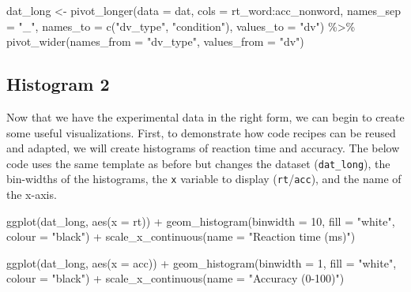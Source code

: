 \documentclass[
  english,
  doc,floatsintext]{apa6}
\newenvironment{Shaded}{\begin{snugshade}}{\end{snugshade}}
\newcommand{\AttributeTok}[1]{\textcolor[rgb]{0.77,0.63,0.00}{#1}}
\newcommand{\DecValTok}[1]{\textcolor[rgb]{0.00,0.00,0.81}{#1}}
\newcommand{\FunctionTok}[1]{\textcolor[rgb]{0.00,0.00,0.00}{#1}}
\newcommand{\NormalTok}[1]{#1}
\newcommand{\OtherTok}[1]{\textcolor[rgb]{0.56,0.35,0.01}{#1}}
\newcommand{\SpecialCharTok}[1]{\textcolor[rgb]{0.00,0.00,0.00}{#1}}
\newcommand{\StringTok}[1]{\textcolor[rgb]{0.31,0.60,0.02}{#1}}
\begin{document}
\begin{Shaded}
\begin{Highlighting}[]
\NormalTok{dat\_long }\OtherTok{\textless{}{-}} \FunctionTok{pivot\_longer}\NormalTok{(}\AttributeTok{data =}\NormalTok{ dat, }
                         \AttributeTok{cols =}\NormalTok{ rt\_word}\SpecialCharTok{:}\NormalTok{acc\_nonword, }
                         \AttributeTok{names\_sep =} \StringTok{"\_"}\NormalTok{, }
                         \AttributeTok{names\_to =} \FunctionTok{c}\NormalTok{(}\StringTok{"dv\_type"}\NormalTok{, }\StringTok{"condition"}\NormalTok{),}
                         \AttributeTok{values\_to =} \StringTok{"dv"}\NormalTok{) }\SpecialCharTok{\%\textgreater{}\%}
  \FunctionTok{pivot\_wider}\NormalTok{(}\AttributeTok{names\_from =} \StringTok{"dv\_type"}\NormalTok{, }
              \AttributeTok{values\_from =} \StringTok{"dv"}\NormalTok{)}
\end{Highlighting}
\end{Shaded}

\hypertarget{histogram-2}{%
\subsection{Histogram 2}\label{histogram-2}}

Now that we have the experimental data in the right form, we can begin to create some useful visualizations. First, to demonstrate how code recipes can be reused and adapted, we will create histograms of reaction time and accuracy. The below code uses the same template as before but changes the dataset (\texttt{dat\_long}), the bin-widths of the histograms, the \texttt{x} variable to display (\texttt{rt}/\texttt{acc}), and the name of the x-axis.

\begin{Shaded}
\begin{Highlighting}[]
\FunctionTok{ggplot}\NormalTok{(dat\_long, }\FunctionTok{aes}\NormalTok{(}\AttributeTok{x =}\NormalTok{ rt)) }\SpecialCharTok{+}
  \FunctionTok{geom\_histogram}\NormalTok{(}\AttributeTok{binwidth =} \DecValTok{10}\NormalTok{, }\AttributeTok{fill =} \StringTok{"white"}\NormalTok{, }\AttributeTok{colour =} \StringTok{"black"}\NormalTok{) }\SpecialCharTok{+}
  \FunctionTok{scale\_x\_continuous}\NormalTok{(}\AttributeTok{name =} \StringTok{"Reaction time (ms)"}\NormalTok{)}

\FunctionTok{ggplot}\NormalTok{(dat\_long, }\FunctionTok{aes}\NormalTok{(}\AttributeTok{x =}\NormalTok{ acc)) }\SpecialCharTok{+}
  \FunctionTok{geom\_histogram}\NormalTok{(}\AttributeTok{binwidth =} \DecValTok{1}\NormalTok{, }\AttributeTok{fill =} \StringTok{"white"}\NormalTok{, }\AttributeTok{colour =} \StringTok{"black"}\NormalTok{) }\SpecialCharTok{+}
  \FunctionTok{scale\_x\_continuous}\NormalTok{(}\AttributeTok{name =} \StringTok{"Accuracy (0{-}100)"}\NormalTok{)}
\end{Highlighting}
\end{Shaded}
\end{document}
